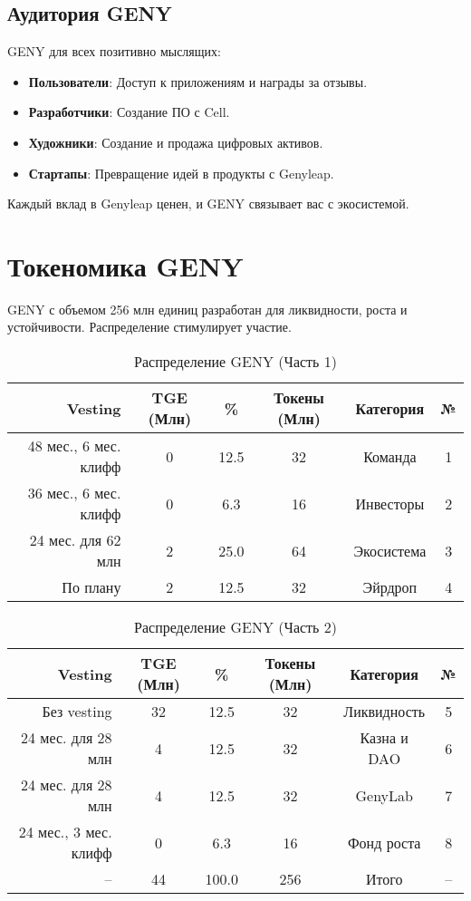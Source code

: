 \documentclass[a4paper,12pt,openany]{book}
\begin{document}
\subsection*{Аудитория GENY}
GENY для всех позитивно мыслящих:
\begin{itemize}
    \item \textbf{Пользователи}: Доступ к приложениям и награды за отзывы.
    \item \textbf{Разработчики}: Создание ПО с Cell.
    \item \textbf{Художники}: Создание и продажа цифровых активов.
    \item \textbf{Стартапы}: Превращение идей в продукты с Genyleap.
\end{itemize}
Каждый вклад в Genyleap ценен, и GENY связывает вас с экосистемой.
\newpage

\section*{Токеномика GENY}
GENY с объемом 256 млн единиц разработан для ликвидности, роста и устойчивости. Распределение стимулирует участие.

\begin{table}[h]
\centering
\caption{Распределение GENY (Часть 1)}
\small
\begin{tabular}{r c c c c c}
\hline
\textbf{Vesting} & \textbf{TGE (Млн)} & \textbf{\%} & \textbf{Токены (Млн)} & \textbf{Категория} & \textbf{№} \\
\hline
48 мес., 6 мес. клифф & 0 & 12.5 & 32 & Команда & 1 \\
36 мес., 6 мес. клифф & 0 & 6.3 & 16 & Инвесторы & 2 \\
24 мес. для 62 млн & 2 & 25.0 & 64 & Экосистема & 3 \\
По плану & 2 & 12.5 & 32 & Эйрдроп & 4 \\
\hline
\end{tabular}
\end{table}

\begin{table}[h]
\centering
\caption{Распределение GENY (Часть 2)}
\small
\begin{tabular}{r c c c c c}
\hline
\textbf{Vesting} & \textbf{TGE (Млн)} & \textbf{\%} & \textbf{Токены (Млн)} & \textbf{Категория} & \textbf{№} \\
\hline
Без vesting & 32 & 12.5 & 32 & Ликвидность & 5 \\
24 мес. для 28 млн & 4 & 12.5 & 32 & Казна и DAO & 6 \\
24 мес. для 28 млн & 4 & 12.5 & 32 & GenyLab & 7 \\
24 мес., 3 мес. клифф & 0 & 6.3 & 16 & Фонд роста & 8 \\
\hline
-- & 44 & 100.0 & 256 & Итого & -- \\
\hline
\end{tabular}
\end{table}
\end{document}
